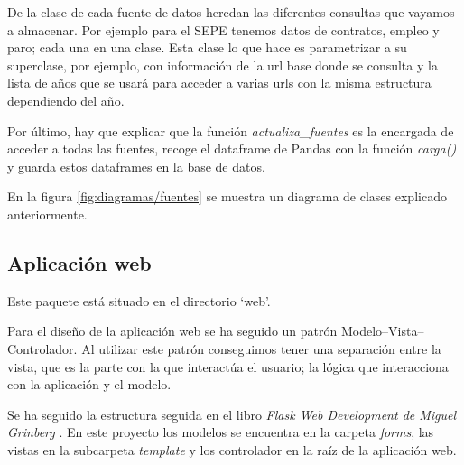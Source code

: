 De la clase de cada fuente de datos heredan las diferentes consultas que vayamos a almacenar. Por ejemplo para el SEPE tenemos datos de contratos, empleo y paro; cada una en una clase. Esta clase lo que hace es parametrizar a su superclase, por ejemplo, con información de la url base donde se consulta y la lista de años que se usará para acceder a varias urls con la misma estructura dependiendo del año.

Por último, hay que explicar que la función \textit{actualiza\_fuentes} es la encargada de acceder a todas las fuentes, recoge el dataframe de Pandas con la función \textit{carga()} y guarda estos dataframes en la base de datos.

En la figura \ref{fig:diagramas/fuentes} se muestra un diagrama de clases explicado anteriormente.


\subsection{Aplicación web}

Este paquete está situado en el directorio `web'.

Para el diseño de la aplicación web se ha seguido un patrón Modelo--Vista--Controlador. Al utilizar este patrón conseguimos tener una separación entre la vista, que es la parte con la que interactúa el usuario; la lógica que interacciona con la aplicación y el modelo.


Se ha seguido la estructura seguida en el libro \textit{Flask Web Development de Miguel Grinberg} \cite{book:flask}. En este proyecto los modelos se encuentra en la carpeta \textit{forms}, las vistas en la subcarpeta \textit{template} y los controlador en la raíz de la aplicación web.
